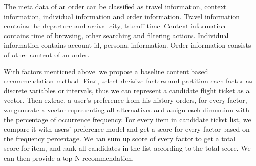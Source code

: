 \documentclass{sig-alternate-05-2015}
\begin{document}
The meta data of an order can be classified as travel information, context information, individual information and order information. Travel information contains the departure and arrival city, takeoff time. Context information contains time of browsing, other searching and filtering actions. Individual information contains account id, personal information. Order information consists of other content of an order.\par

With factors mentioned above, we propose a baseline content based recommendation method. First, select decisive factors and partition each factor as discrete variables or intervals, thus we can represent a candidate flight ticket as a vector. Then extract a user's preference from his history orders, for every factor, we generate a vector representing all alternatives and assign each dimension with the percentage of occurrence frequency. For every item in candidate ticket list, we compare it with users' preference model and get a score for every factor based on the frequency percentage. We can sum up score of every factor to get a total score for item, and rank all candidates in the list according to the total score. We can then provide a top-N recommendation.\par
\end{document}
